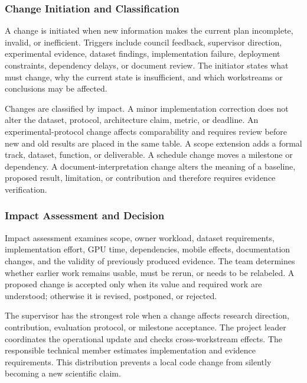 \subsubsection{Change Initiation and Classification}
A change is initiated when new information makes the current plan incomplete, invalid, or inefficient. Triggers include council feedback, supervisor direction, experimental evidence, dataset findings, implementation failure, deployment constraints, dependency delays, or document review. The initiator states what must change, why the current state is insufficient, and which workstreams or conclusions may be affected.\par
Changes are classified by impact. A minor implementation correction does not alter the dataset, protocol, architecture claim, metric, or deadline. An experimental-protocol change affects comparability and requires review before new and old results are placed in the same table. A scope extension adds a formal track, dataset, function, or deliverable. A schedule change moves a milestone or dependency. A document-interpretation change alters the meaning of a baseline, proposed result, limitation, or contribution and therefore requires evidence verification.\par
\subsubsection{Impact Assessment and Decision}
Impact assessment examines scope, owner workload, dataset requirements, implementation effort, GPU time, dependencies, mobile effects, documentation changes, and the validity of previously produced evidence. The team determines whether earlier work remains usable, must be rerun, or needs to be relabeled. A proposed change is accepted only when its value and required work are understood; otherwise it is revised, postponed, or rejected.\par
{}
The supervisor has the strongest role when a change affects research direction, contribution, evaluation protocol, or milestone acceptance. The project leader coordinates the operational update and checks cross-workstream effects. The responsible technical member estimates implementation and evidence requirements. This distribution prevents a local code change from silently becoming a new scientific claim.\par
